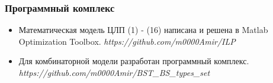 \begin{frame}
    \frametitle{Программный комплекс}
    \fontsize{8pt}{7.2}\selectfont
    \begin{itemize}
        \item Математическая модель ЦЛП (1) - (16) написана и решена в Matlab Optimization Toolbox. \textit{https://github.com/m0000Amir/ILP}
        \item Для комбинаторной модели разработан программный комплекс. \textit{https://github.com/m0000Amir/BST\_BS\_types\_set}
    \end{itemize}
    



    \begin{minipage}[b]{0.5\linewidth}
        \fontsize{9pt}{7.2}\selectfont
    \end{minipage}
    \hfill
    \begin{minipage}[b]{0.45\linewidth}
        
    \end{minipage}
    \bigskip



    
\end{frame}

